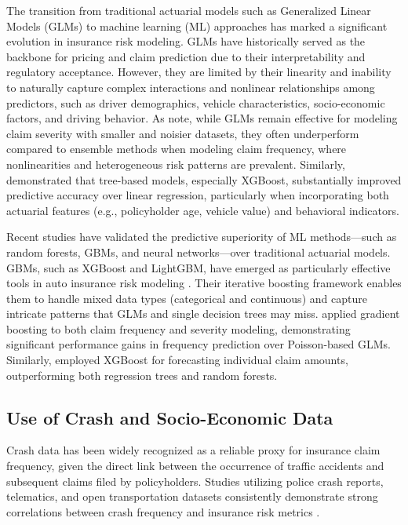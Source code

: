 \documentclass[
  number,
  review,
  3p]{elsarticle}
\begin{document}
The transition from traditional actuarial models such as Generalized
Linear Models (GLMs) to machine learning (ML) approaches has marked a
significant evolution in insurance risk modeling. GLMs have historically
served as the backbone for pricing and claim prediction due to their
interpretability and regulatory acceptance. However, they are limited by
their linearity and inability to naturally capture complex interactions
and nonlinear relationships among predictors, such as driver
demographics, vehicle characteristics, socio-economic factors, and
driving behavior. As \citet{clemente} note, while GLMs remain effective
for modeling claim severity with smaller and noisier datasets, they
often underperform compared to ensemble methods when modeling claim
frequency, where nonlinearities and heterogeneous risk patterns are
prevalent. Similarly, \citet{jonkheijm} demonstrated that tree-based
models, especially XGBoost, substantially improved predictive accuracy
over linear regression, particularly when incorporating both actuarial
features (e.g., policyholder age, vehicle value) and behavioral
indicators.

Recent studies have validated the predictive superiority of ML
methods---such as random forests, GBMs, and neural networks---over
traditional actuarial models. GBMs, such as XGBoost and LightGBM, have
emerged as particularly effective tools in auto insurance risk modeling
\citep{henckaerts}. Their iterative boosting framework enables them to
handle mixed data types (categorical and continuous) and capture
intricate patterns that GLMs and single decision trees may miss.
\citet{clemente} applied gradient boosting to both claim frequency and
severity modeling, demonstrating significant performance gains in
frequency prediction over Poisson-based GLMs. Similarly,
\citet{jonkheijm} employed XGBoost for forecasting individual claim
amounts, outperforming both regression trees and random forests.

\subsection{\texorpdfstring{\textbf{Use of Crash and Socio-Economic
Data}}{Use of Crash and Socio-Economic Data}}\label{use-of-crash-and-socio-economic-data}

Crash data has been widely recognized as a reliable proxy for insurance
claim frequency, given the direct link between the occurrence of traffic
accidents and subsequent claims filed by policyholders. Studies
utilizing police crash reports, telematics, and open transportation
datasets consistently demonstrate strong correlations between crash
frequency and insurance risk metrics \citep{takale}.
\end{document}

